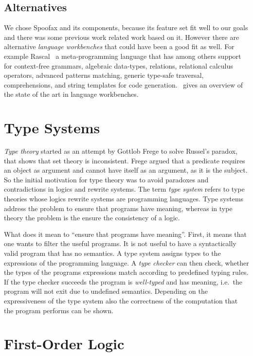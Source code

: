 \subsection{Alternatives}
We chose Spoofax and its components, because its feature set fit well
to our goals and there was some previous work related work based on
it. However there are alternative \textit{language workbenches} that
could have been a good fit as well. For example
Rascal~\cite{klint2009rascal} a meta-programming language that has
among others support for context-free grammars, algebraic data-types,
relations, relational calculus operators, advanced patterns matching,
generic type-safe traversal, comprehensions, and string templates for
code generation.~\cite{workbenches} gives an overview of the state of
the art in language workbenches.

\section{Type Systems}
\textit{Type theory} started as an attempt by Gottlob Frege to solve
Russel's paradox, that shows that \naive{} set theory is
inconsistent. Frege argued that a predicate requires an object as
argument and cannot have itself as an argument, as it is the
subject. So the initial motivation for type theory was to avoid
paradoxes and contradictions in logics and rewrite systems. The term
\textit{type system} refers to type theories whose logics rewrite
systems are programming languages. Type systems address the problem to
ensure that programs have meaning, whereas in type theory the problem
is the ensure the consistency of a logic.

What does it mean to ``ensure that programs have meaning''. First, it
means that one wants to filter the useful programs. It is not useful
to have a syntactically valid program that has no semantics. A type
system assigns types to the expressions of the programming language. A
\textit{type checker} can then check, whether the types of the
programs expressions match according to predefined typing rules. If
the type checker succeeds the program is \textit{well-typed} and has
meaning, i.e.\ the program will not exit due to undefined
semantics. Depending on the expressiveness of the type system also the
correctness of the computation that the program performs can be shown.

\section{First-Order Logic}

